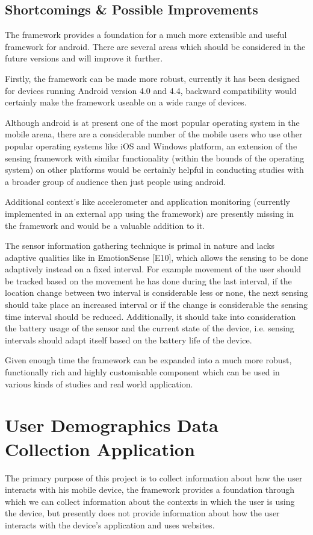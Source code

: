 \documentclass[12pt]{report}
\begin{document}
\section{Shortcomings \& Possible Improvements}

The framework provides a foundation for a much more extensible and useful framework for android. There are several areas which should be considered in the future versions and will improve it further.

Firstly, the framework can be made more robust, currently it has been designed for devices running Android version 4.0 and 4.4, backward compatibility would certainly make the framework useable on a wide range of devices. 

Although android is at present one of the most popular operating system in the mobile arena, there are a considerable number of the mobile users who use other popular operating systems like iOS and Windows platform, an extension of the sensing framework with similar functionality (within the bounds of the operating system) on other platforms would be certainly helpful in conducting studies with a broader group of audience then just people using android.

Additional context's like accelerometer and application monitoring (currently implemented in an external app using the framework) are presently missing in the framework and would be a valuable addition to it.

The sensor information gathering technique is primal in nature and lacks adaptive qualities like in EmotionSense [E10], which allows the sensing to be done adaptively instead on a fixed interval. For example movement of the user should be tracked based on the movement he has done during the last interval, if the location change between two interval is considerable less or none, the next sensing should take place an increased interval or if the change is considerable the sensing time interval should be reduced. Additionally, it should take into consideration the battery usage of the sensor and the current state of the device, i.e. sensing intervals should adapt itself based on the battery life of the device.

Given enough time the framework can be expanded into a much more robust, functionally rich and highly customisable component which can be used in various kinds of studies and real world application. 

\chapter{User Demographics Data Collection Application}
The primary purpose of this project is to collect information about how the user interacts with his mobile device, the framework provides a foundation through which we can collect information about the contexts in which the user is using the device, but presently does not provide information about how the user interacts with the device's application and uses websites.
\end{document}
